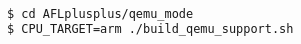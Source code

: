 

\begin{lstlisting}[language=bash, caption={Bauen des QEMU-Supports von AFL für ARM Binarys},label={lst:build-qemu}]
$ cd AFLplusplus/qemu_mode
$ CPU_TARGET=arm ./build_qemu_support.sh
\end{lstlisting}